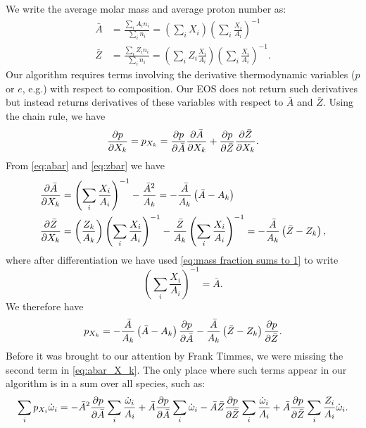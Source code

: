   We write the average molar mass and average proton number as:
  \begin{align}\label{eq:abar}
    \bar{A} &= \frac{\sum_i A_i n_i}{\sum_i n_i} = \left(\sum_i X_i\right)
    \left(\sum_i \frac{X_i}{A_i}\right)^{-1}\\
    \label{eq:zbar}
    \bar{Z} &= \frac{\sum_i Z_i n_i}{\sum_i n_i} = \left(\sum_i Z_i
    \frac{X_i}{A_i}\right)\left(\sum_i \frac{X_i}{A_i}\right)^{-1}.
  \end{align}
  Our algorithm requires terms involving the derivative thermodynamic variables
  ($p$ or $e$, e.g.) with respect to composition.  Our EOS does not return such
  derivatives but instead returns derivatives of these variables with respect 
  to $\bar{A}$ and $\bar{Z}$.  Using the chain rule, we have
  \begin{equation}\label{eq:p_xk}
    \frac{\partial p}{\partial X_k} = p_{X_k} = 
    \frac{\partial p}{\partial \bar{A}}\frac{\partial \bar{A}}{\partial X_k} + 
    \frac{\partial p}{\partial \bar{Z}}\frac{\partial \bar{Z}}{\partial X_k}.
  \end{equation}
  From \eqref{eq:abar} and \eqref{eq:zbar} we have
  \begin{align}\label{eq:abar_X_k}
    \frac{\partial \bar{A}}{\partial X_k} &= \left(\sum_i \frac{X_i}{A_i}\right)^{-1}
    - \frac{\bar{A}^2}{A_k} = -\frac{\bar{A}}{A_k}\left(\bar{A} - A_k\right)\\
    \label{eq:zbar_X_k}
    \frac{\partial \bar{Z}}{\partial X_k} &= 
    \left(\frac{Z_k}{A_k}\right)\left(\sum_i \frac{X_i}{A_i}\right)^{-1}
    - \frac{\bar{Z}}{A_k}\left(\sum_i \frac{X_i}{A_i}\right)^{-1} = 
    -\frac{\bar{A}}{A_k}\left(\bar{Z} - Z_k\right),
  \end{align}
  where after differentiation we have used \eqref{eq:mass fraction sums to 1}
  to write
  \[
  \left(\sum_i \frac{X_i}{A_i}\right)^{-1} = \bar{A}.
  \]
  We therefore have
  \begin{equation}\label{eq:p_Xk_full}
    p_{X_k} = -\frac{\bar{A}}{A_k}\left(\bar{A} - A_k\right)
    \frac{\partial p}{\partial\bar{A}} - \frac{\bar{A}}{A_k}\left(\bar{Z} - Z_k\right)
    \frac{\partial p}{\partial\bar{Z}}.
  \end{equation}
  Before it was brought to our attention by Frank Timmes, we were missing the
  second term in \eqref{eq:abar_X_k}.  The only place where such terms 
  appear in our algorithm is in a sum over all species, such as:
  \begin{equation}\label{eq:sum over species}
    \sum_i p_{X_i}\dot{\omega}_i = 
    -\bar{A}^2\frac{\partial p}{\partial\bar{A}}\sum_i \frac{\dot{\omega}_i}{A_i}
    +\bar{A}\frac{\partial p}{\partial\bar{A}}\sum_i \dot{\omega}_i
    -\bar{A}\bar{Z}\frac{\partial p}{\partial\bar{Z}}\sum_i \frac{\dot{\omega}_i}{A_i}
    +\bar{A}\frac{\partial p}{\partial \bar{Z}}\sum_i\frac{Z_i}{A_i}\dot{\omega}_i.
  \end{equation}
